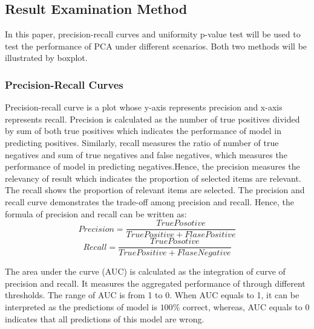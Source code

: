 \documentclass[12pt]{article}
\begin{document}
\subsection{Result Examination Method}
In this paper, precision-recall curves and uniformity p-value test will be used to test the performance of PCA under different scenarios. Both two methods will be illustrated by boxplot.
\subsubsection{Precision-Recall Curves}
Precision-recall curve is a plot whose y-axis represents precision and x-axis represents recall. Precision is calculated as the number of true positives divided by sum of both true positives which indicates the performance of model in predicting positives. Similarly, recall measures the ratio of number of true negatives and sum of true negatives and false negatives, which measures the performance of model in predicting negatives.Hence, the precision measures the relevancy of result which indicates the proportion of selected items are relevant. The recall shows the proportion of relevant items are selected. The precision and recall curve demonstrates the trade-oﬀ among precision and recall. Hence, the formula of precision and recall can be written as:
$$Precision=\frac{True Posotive}{True Positive+Flase Positive}$$
$$Recall=\frac{True Posotive}{True Positive+Flase Negative}$$

The area under the curve (AUC) is calculated as the integration of curve of precision and recall. It measures the aggregated performance of through diﬀerent thresholds. The range of AUC is from 1 to 0. When AUC equals to 1, it can be interpreted as the predictions of model is $100\%$ correct, whereas, AUC equals to 0 indicates that all predictions of this model are wrong. 
\end{document}
